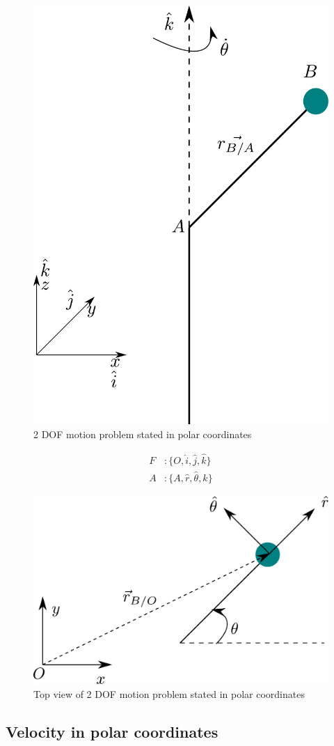 \begin{figure}[h!]
	\centering
	\includegraphics[width=0.5\linewidth]{Bilder/05_vel_acc_polar_coordinates.pdf}
	\caption{2 DOF motion problem stated in polar coordinates}
	\label{Fig_0_ch_0_vel_Acc_polarCoordinates}
\end{figure}

\begin{align*}
	F &: \{O,\hat{i},\hat{j},\hat{k}\} \\
	A &: \{A, \hat{r}, \hat{\theta}, \hat{k}\}
\end{align*}

\newpage
\begin{figure}[h!]
	\centering
	\includegraphics[width=0.5\linewidth]{Bilder/06_vel_acc_polar_coordinates_topView.pdf}
	\caption{Top view of 2 DOF motion problem stated in polar coordinates}
	\label{Fig_0_ch_0_vel_Acc_polarCoordinates_TopView}
\end{figure}

\subsection{Velocity in polar coordinates}

